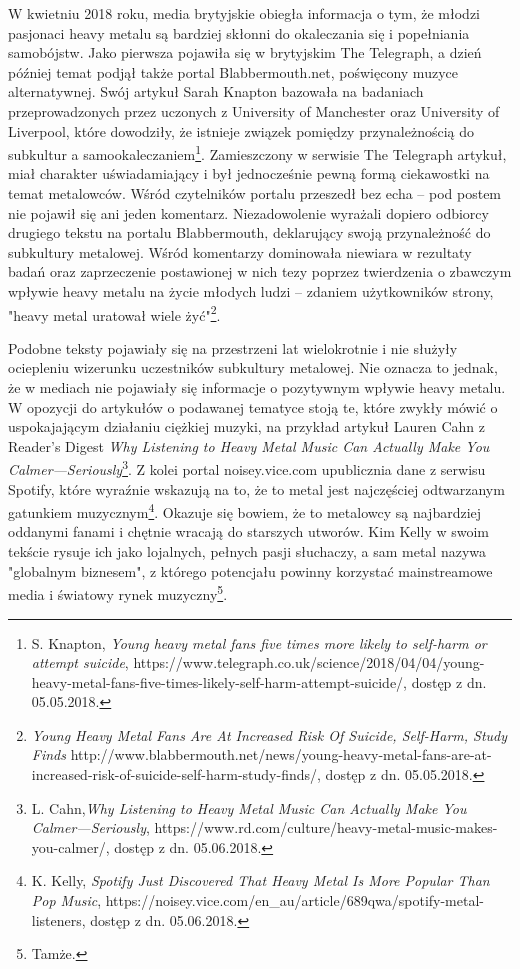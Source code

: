 \documentclass[12pt, a4paper, titlepage]{report}
\begin{document}
W kwietniu 2018 roku, media brytyjskie obiegła informacja o tym, że młodzi pasjonaci heavy metalu są bardziej skłonni do okaleczania się i popełniania samobójstw. Jako pierwsza pojawiła się w brytyjskim The Telegraph, a dzień później temat podjął także portal Blabbermouth.net, poświęcony muzyce alternatywnej. Swój artykuł Sarah Knapton bazowała na badaniach przeprowadzonych przez uczonych z University of Manchester oraz University of Liverpool, które dowodziły, że istnieje związek pomiędzy przynależnością do subkultur a samookaleczaniem\footnote{S. Knapton, \textit{Young heavy metal fans five times more likely to self-harm or attempt suicide}, https://www.telegraph.co.uk/science/2018/04/04/young-heavy-metal-fans-five-times-likely-self-harm-attempt-suicide/, dostęp z dn. 05.05.2018.}. Zamieszczony w serwisie The Telegraph artykuł, miał charakter uświadamiający i był jednocześnie pewną formą ciekawostki na temat metalowców. Wśród czytelników portalu przeszedł bez echa -- pod postem nie pojawił się ani jeden komentarz. Niezadowolenie wyrażali dopiero odbiorcy drugiego tekstu na portalu Blabbermouth, deklarujący swoją przynależność do subkultury metalowej. Wśród komentarzy dominowała niewiara w rezultaty badań oraz zaprzeczenie postawionej w nich tezy poprzez twierdzenia o zbawczym wpływie heavy metalu na życie młodych ludzi -- zdaniem użytkowników strony, "heavy metal uratował wiele żyć"\footnote{\textit{Young Heavy Metal Fans Are At Increased Risk Of Suicide, Self-Harm, Study Finds} http://www.blabbermouth.net/news/young-heavy-metal-fans-are-at-increased-risk-of-suicide-self-harm-study-finds/, dostęp z dn. 05.05.2018.}.

Podobne teksty pojawiały się na przestrzeni lat wielokrotnie i nie służyły ociepleniu wizerunku uczestników subkultury metalowej. Nie oznacza to jednak, że w mediach nie pojawiały się informacje o pozytywnym wpływie heavy metalu. W opozycji do artykułów o podawanej tematyce stoją te, które zwykły mówić o uspokajającym działaniu ciężkiej muzyki, na przykład artykuł Lauren Cahn z Reader's Digest \textit{Why Listening to Heavy Metal Music Can Actually Make You Calmer—Seriously}\footnote{L. Cahn,\textit{Why Listening to Heavy Metal Music Can Actually Make You Calmer—Seriously}, https://www.rd.com/culture/heavy-metal-music-makes-you-calmer/, dostęp z dn. 05.06.2018.}. Z kolei portal noisey.vice.com upublicznia dane z serwisu Spotify, które wyraźnie wskazują na to, że to metal jest najczęściej odtwarzanym gatunkiem muzycznym\footnote{K. Kelly, \textit{Spotify Just Discovered That Heavy Metal Is More Popular Than Pop Music}, https://noisey.vice.com/en_au/article/689qwa/spotify-metal-listeners, dostęp z dn. 05.06.2018.}. Okazuje się bowiem, że to metalowcy są najbardziej oddanymi fanami i chętnie wracają do starszych utworów. Kim Kelly w swoim tekście rysuje ich jako lojalnych, pełnych pasji słuchaczy, a sam metal nazywa "globalnym biznesem", z którego potencjału powinny korzystać mainstreamowe media i światowy rynek muzyczny\footnote{Tamże.}.
\end{document}
